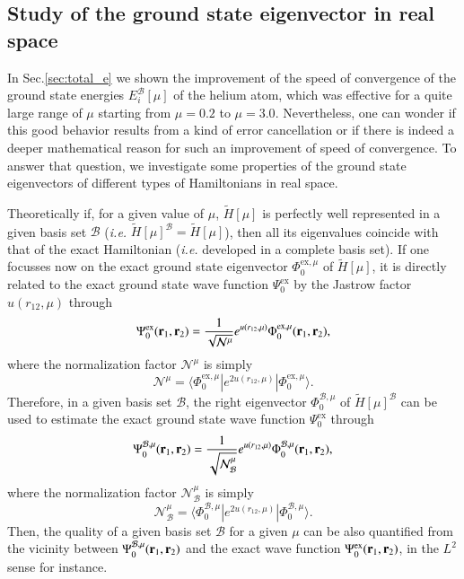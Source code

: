 \documentclass[aip,jcp,reprint,noshowkeys,superscriptaddress]{revtex4-1}
\newcommand{\matelem}[3]{\langle #1 | #2 | #3 \rangle}
\newcommand{\br}[0]{{\bf {r}}}
\newcommand{\psiex}[0]{\Psi^{\text{ex}}_0}
\newcommand{\phimu}[0]{\Phi^{\text{ex},\mu}_0}
\newcommand{\phimub}[0]{\Phi^{\mathcal{B},\mu}_0}
\newcommand{\psimub}[0]{\Psi^{\mathcal{B},\mu}_0}
\newcommand{\basis}[0]{\mathcal{B}}
\begin{document}
\subsection{Study of the ground state eigenvector in real space}
In Sec.\ref{sec:total_e} we shown the improvement of the speed of convergence of the ground state energies $E_i^{\basis}[\mu]$ of the helium atom, which was effective for a quite large range of $\mu$ starting from $\mu=0.2$ to $\mu=3.0$. 
Nevertheless, one can wonder if this good behavior results from a kind of error cancellation or if there is indeed a deeper mathematical reason for such an improvement of speed of convergence. 
To answer that question, we investigate some properties of the ground state eigenvectors of different types of Hamiltonians in real space. 

Theoretically if, for a given value of $\mu$, $\tilde{H}[\mu]$ is perfectly well represented in a given basis set $\mathcal{B}$ (\textit{i.e.} $\tilde{H}[\mu]^{\basis} = \tilde{H}[\mu]$), then all its eigenvalues coincide with that of the exact Hamiltonian (\textit{i.e.} developed in a complete basis set). If one focusses now on the exact ground state eigenvector $\phimu$ of $\tilde{H}[\mu]$, it is directly related to the exact ground state wave function $\psiex$ by the Jastrow factor $u(r_{12},\mu)$ through 
\begin{equation}
 \psiex(\br{}_1,\br{}_2) =  \frac{1}{\sqrt{\mathcal{N}^{\mu}}} e^{u(r_{12},\mu)} \phimu(\br{}_1,\br{}_2), 
\end{equation}
where the normalization factor $\mathcal{N}^{\mu}$ is simply 
\begin{equation}
  \mathcal{N}^{\mu} = \matelem{\phimu}{e^{2 u(r_{12},\mu)}}{\phimu}.
\end{equation}
Therefore, in a given basis set $\basis$, the right eigenvector $\phimub$ of $\tilde{H}[\mu]^{\basis}$ can be used to estimate the exact ground state wave function $\psiex$ through 
\begin{equation}
 \psimub(\br{}_1,\br{}_2) = \frac{1}{\sqrt{\mathcal{N}_{\basis}^{\mu}}}e^{u(r_{12},\mu)}\phimub(\br{}_1,\br{}_2),
\end{equation}
where the normalization factor $\mathcal{N}_{\basis}^{\mu}$ is simply
\begin{equation}
  \mathcal{N}_{\basis}^{\mu} = \matelem{\phimub}{e^{2 u(r_{12},\mu)}}{\phimub}.
\end{equation}
Then, the quality of a given basis set $\basis$ for a given $\mu$ can be also quantified from the vicinity between $\psimub(\br{}_1,\br{}_2)$ and the exact wave function $\psiex(\br{}_1,\br{}_2)$, in the $L^2$ sense for instance. 
\end{document}
